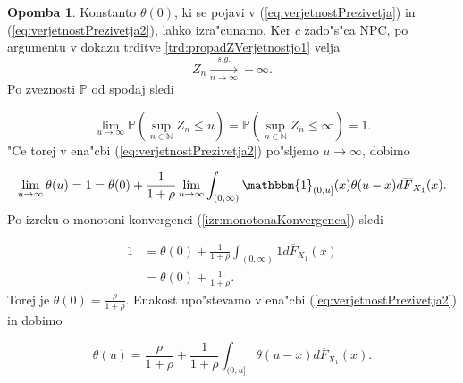 \documentclass[12pt, a4paper, reqno]{amsart}
\theoremstyle{definition}
\newtheorem{opomba}[definicija]{Opomba}
\theoremstyle{plain}
\newcommand{\N}{\mathbb{N}}
\newcommand{\E}{\mathbb{E}}
\newcommand{\Prob}{\mathbb{P}}
\newcommand{\1}{\mathds{1}}
\begin{document}
            \begin{opomba}
                Konstanto $\theta(0)$, ki se pojavi v (\ref{eq:verjetnostPrezivetja}) in      
                (\ref{eq:verjetnostPrezivetja2}), lahko izra"cunamo. Ker $c$ zado"s"ca NPC, po argumentu v dokazu trditve
                \ref{trd:propadZVerjetnostjo1} velja 
                \begin{equation*}
                    Z_n \xrightarrow[n\to\infty]{s.g.} -\infty.
                \end{equation*}
                Po zveznosti $\Prob$ od spodaj sledi

                \begin{equation*}
                    \lim_{u\to\infty}\Prob\left(\sup_{n\in\N}Z_n \leq u\right) = \Prob\left(\sup_{n\in\N}Z_n \leq \infty\right) = 1.
                \end{equation*}
                "Ce torej v ena"cbi (\ref{eq:verjetnostPrezivetja2}) po"sljemo $u\to\infty$, dobimo

                \begin{equation*}
                    \lim_{u\to\infty}\theta(u) = 1 = \theta(0) + \frac{1}{1 + \rho}\lim_{u\to\infty}\int_{(0, \infty)}\mathbbm{1}_{(0, u]}(x)\theta(u - x)d\overline{F}_{X_1}(x). \\
                \end{equation*}
                Po izreku o monotoni konvergenci (\ref{izr:monotonaKonvergenca}) sledi

                \begin{align*}
                    1 &= \theta(0) + \frac{1}{1 + \rho}\int_{(0, \infty)}1d\overline{F}_{X_1}(x) \\
                     &= \theta(0) + \frac{1}{1 + \rho}.
                \end{align*}
                Torej je $\theta(0) = \frac{\rho}{1 + \rho}$.
                Enakost upo"stevamo v ena"cbi (\ref{eq:verjetnostPrezivetja2}) in dobimo

                \begin{equation}
                    \theta(u) = \frac{\rho}{1 + \rho} + \frac{1}{1 + \rho}\int_{(0, u]}\theta(u - x)d\overline{F}_{X_1}(x).
                    \label{eq:verjetnostPrezivetja3}
                \end{equation}

                \label{op:verjetnostPrezivetja2}
            \end{opomba}
\end{document}
